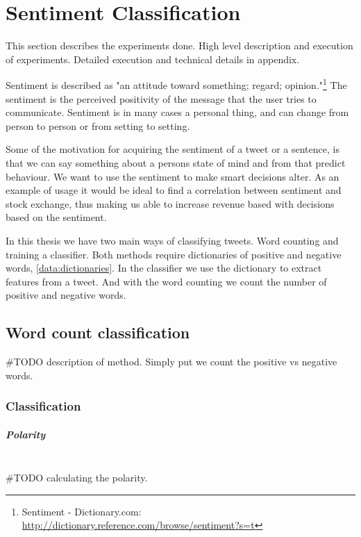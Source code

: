 
\chapter{Sentiment Classification}
This section describes the experiments done. High level description and
execution of experiments. Detailed execution and technical details in appendix. 

Sentiment is described as "an attitude toward something; regard; opinion."\footnote{Sentiment - Dictionary.com: \url{http://dictionary.reference.com/browse/sentiment?s=t}}
The sentiment is the perceived positivity of the message that the user tries to
communicate. Sentiment is in many cases a personal thing, and can change from
person to person or from setting to setting.  

Some of the motivation for acquiring the sentiment of a tweet or a sentence, is
that we can say something about a persons state of mind and from that predict
behaviour. We want to use the sentiment to make smart decisions alter. As an
example of usage it would be ideal to find a correlation between sentiment and
stock exchange, thus making us able to increase revenue based with decisions
based on the sentiment. 

In this thesis we have two main ways of classifying tweets. Word counting and
training a classifier. Both methods require dictionaries of positive and
negative words, \ref{data:dictionaries}. In the classifier we use the dictionary
to extract features from a tweet. And with the word counting we count the
number of positive and negative words. 

\section{Word count classification}
#TODO description of method. 
Simply put we count the positive vs negative words. 

\subsection{Classification}

\paragraph{Polarity} 
\hspace{0pt}\\ 
#TODO calculating the polarity.  

